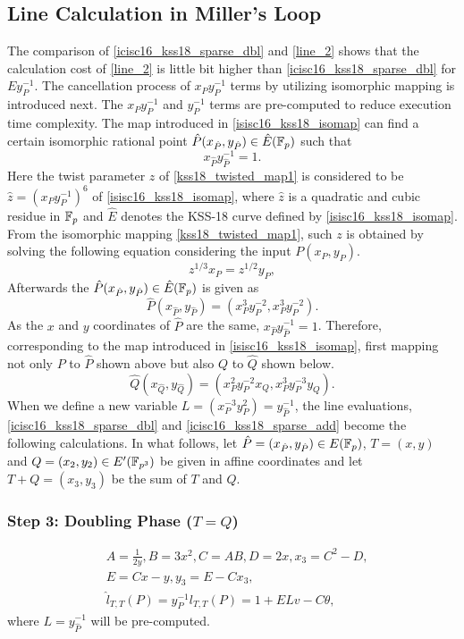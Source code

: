 \subsection{Line Calculation in Miller's Loop} 
The comparison of \eqref{icisc16_kss18_sparse_dbl} and \eqref{line_2} shows that the calculation cost of \eqref{line_2} is little bit higher than \eqref{icisc16_kss18_sparse_dbl} for $Ey_P^{-1}$. The  cancellation process of $x_Py_P^{-1}$ terms by utilizing isomorphic mapping is introduced next. The $x_Py_P^{-1}$ and $y_P^{-1}$ terms are pre-computed to reduce execution time complexity.
The map introduced in \eqref{isisc16_kss18_isomap} can find a certain isomorphic rational point $\hat{P}(x_{\hat{P}},y_{\hat{P}})\in \hat{E}({\mathbb{F}}_{p})$ such that
\begin{equation}
x_{\hat{P}}y_{\hat{P}}^{-1}=1.
\end{equation}
Here the twist parameter $z$ of  \eqref{kss18_twisted_map1} is considered to be $\hat{z}=(x_Py_P^{-1})^6$ of \eqref{isisc16_kss18_isomap}, where $\hat{z}$ is a quadratic and cubic residue in ${\mathbb{F}}_{p}$ and $\hat{E}$ denotes the KSS-18 curve defined by  \eqref{isisc16_kss18_isomap}. From the isomorphic mapping \eqref{kss18_twisted_map1}, such $z$ is obtained by solving the following equation considering the input $P(x_P,y_P)$.
\begin{equation}
z^{1/3}x_P=z^{1/2}y_P,
\end{equation}
Afterwards the $\hat{P}(x_{\hat{P}},y_{\hat{P}})\in \hat{E}({\mathbb{F}}_{p})$ is given as
\begin{equation}
\hat{P}(x_{\hat{P}},y_{\hat{P}})=(x_P^3y_P^{-2},x_P^3y_P^{-2}).
\end{equation}
As the $x$ and $y$ coordinates of $\hat{P}$ are the same, $x_{\hat{P}}y_{\hat{P}}^{-1}=1$. Therefore, corresponding to the map introduced in \eqref{isisc16_kss18_isomap}, first mapping not only $P$ to $\hat{P}$ shown above but also $Q$ to $\hat{Q}$ shown below.
\begin{equation}
\hat{Q}(x_{\hat{Q}},y_{\hat{Q}})=(x_P^2y_P^{-2}x_Q,x_P^3y_P^{-3}y_Q).
\end{equation}
When we define a new variable $L=(x_P^{-3}y_P^2)=y_{\hat{P}}^{-1}$, the line evaluations, \eqref{icisc16_kss18_sparse_dbl} and \eqref{icisc16_kss18_sparse_add} become the following calculations.
In what follows, let $\hat{P}=(x_{\hat{P}},y_{\hat{P}})\in E({\mathbb{F}}_{p})$, $T=(x,y)$ and $Q=(x_2,y_2)\in E'(\mathbb{F}_{p^{3}})$ be given in affine coordinates and let $T+Q=(x_3,y_3)$ be the sum of $T$ and $Q$.
\subsubsection{Step 3: Doubling Phase \texorpdfstring{($T=Q$)}{}}
\begin{eqnarray}
&A=\frac{1}{2y}, B=3x^2, C=AB, D=2x, x_3=C^2-D,\nonumber\\
&E=Cx-y, y_3=E-Cx_3,\nonumber\\
&\hat{l}_{T,T}(P) = y^{-1}_Pl_{T,T}(P)=1+ELv-C\theta,\label{pseudo_dbl}
\end{eqnarray}
where $L=y_{\hat{P}}^{-1}$ will be pre-computed.
